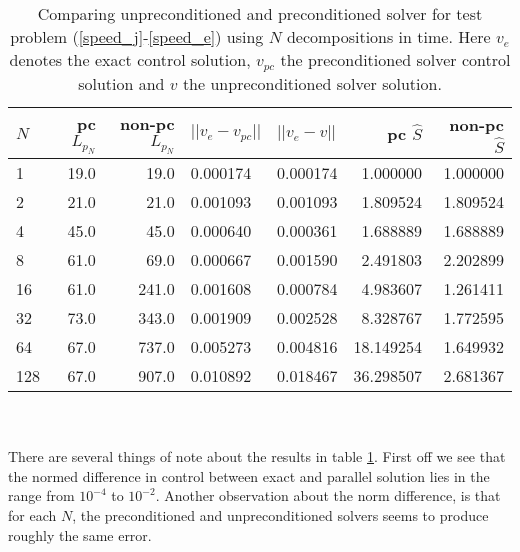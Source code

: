 \begin{table}[h]
\centering
\caption{Comparing unpreconditioned and preconditioned solver for test problem (\ref{speed_j}-\ref{speed_e}) using $N$ decompositions in time. Here $v_e$ denotes the exact control solution, $v_{pc}$ the preconditioned solver control solution and $v$ the unpreconditioned solver solution.}
\label{compare_table}
\begin{tabular}{lrrllrr}
\toprule
{}$N$ &  pc $L_{p_N}$ &  non-pc $L_{p_N}$ &       $||v_e-v_{pc}||$ &  $||v_e-v||$  &  pc $\hat{S}$ &  non-pc $\hat{S}$ \\
\midrule
1   &     19.0 &      19.0 &  0.000174 &    0.000174 &    1.000000 &        1.000000 \\
2   &     21.0 &      21.0 &  0.001093 &    0.001093 &    1.809524 &        1.809524 \\
4   &     45.0 &      45.0 &  0.000640 &    0.000361 &    1.688889 &        1.688889 \\
8   &     61.0 &      69.0 &  0.000667 &    0.001590 &    2.491803 &        2.202899 \\
16  &     61.0 &     241.0 &  0.001608 &    0.000784 &    4.983607 &        1.261411 \\
32  &     73.0 &     343.0 &  0.001909 &    0.002528 &    8.328767 &        1.772595 \\
64  &     67.0 &     737.0 &  0.005273 &    0.004816 &   18.149254 &        1.649932 \\
128 &     67.0 &     907.0 &  0.010892 &    0.018467 &   36.298507 &        2.681367 \\
\bottomrule
\end{tabular}
\end{table}
\\
\\
There are several things of note about the results in table \ref{compare_table}. First off we see that the normed difference in control between exact and parallel solution lies in the range from $10^{-4}$ to $10^{-2}$. Another observation about the norm difference, is that for each $N$, the preconditioned and unpreconditioned solvers seems to produce roughly the same error. 
\\
\\
